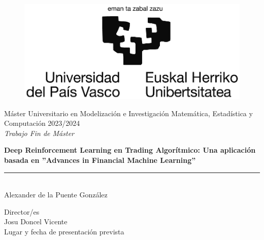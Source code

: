 \documentclass[a4paper,12pt]{report}
\begin{document}
\begin{titlepage}
\begin{sffamily}
\color{NavyBlue}
\begin{center}
\begin{figure}[htb]
\begin{center}
\vspace*{0.6cm}
\includegraphics[width=15cm]{figures/logoEHU_blanco_mediano.eps}
\vspace*{1.6cm}
\end{center}
\end{figure}
\begin{LARGE}
Máster Universitario en Modelización e Investigación Matemática, Estadística y Computación 
2023/2024 \\%
\vspace*{1cm}
\textsl{Trabajo Fin de Máster}\\
\end{LARGE}
\Huge{\textbf{Deep Reinforcement Learning en Trading Algorítmico: Una aplicación basada en ''Advances in Financial Machine Learning''}} %
\vspace*{1cm}
\rule{80mm}{0.1mm}\\
\huge{Alexander de la Puente González}\\ %
\vspace*{0.5cm}
\begin{Large}
Director/es\\
Josu Doncel Vicente\\
Lugar y fecha de presentación prevista\\
\end{Large}
\end{center}
\end{sffamily}
\end{titlepage}
\end{document}
